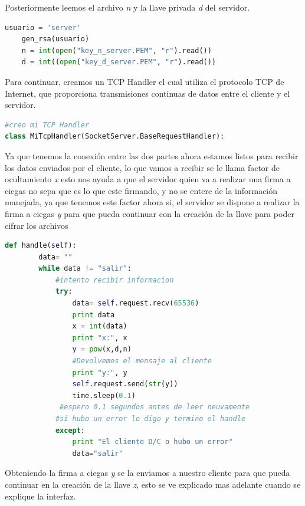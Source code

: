Posteriormente leemos el archivo \textit{n} y la llave privada \textit{d} del servidor.

	\begin{lstlisting}[language=Python,frame=single, keywordstyle=\color{blue}]
	usuario = 'server'
	gen_rsa(usuario)
	n = int(open("key_n_server.PEM", "r").read())
	d = int((open("key_d_server.PEM", "r").read())
	\end{lstlisting}

Para continuar, creamos un TCP Handler el cual utiliza el protocolo TCP de Internet, que proporciona transmisiones continuas de datos entre el cliente y el servidor.

 
\begin{lstlisting}[language=Python,frame=single, keywordstyle=\color{blue}]
#creo mi TCP Handler
class MiTcpHandler(SocketServer.BaseRequestHandler):
\end{lstlisting}


Ya que tenemos la conexión entre las dos partes ahora estamos listos para recibir los datos enviados por el cliente, lo que vamos a recibir se le llama factor de ocultamiento  \textit{x} esto nos ayuda a que el servidor quien va a realizar una firma a ciegas no sepa que es lo que este firmando, y no se entere de la información manejada, ya que tenemos este factor ahora si, el servidor se dispone a realizar la firma a ciegas \textit{y} para que pueda continuar con la creación de la llave para poder cifrar los archivos

\begin{lstlisting}[language=Python,frame=single, keywordstyle=\color{blue}]
       def handle(self):
        data= ""
        while data != "salir":
            #intento recibir informacion
            try:
                data= self.request.recv(65536)
                print data
                x = int(data)
                print "x:", x
                y = pow(x,d,n)
				#Devolvemos el mensaje al cliente
                print "y:", y
                self.request.send(str(y))
                time.sleep(0.1)
			 #espero 0.1 segundos antes de leer neuvamente
            #si hubo un error lo digo y termino el handle
            except:
                print "El cliente D/C o hubo un error"
                data="salir"
\end{lstlisting}

Obteniendo la firma a ciegas \textit{y} se la enviamos a nuestro cliente para que pueda continuar en la creación de la llave \textit{z}, esto se ve explicado mas adelante cuando se explique la interfaz.



